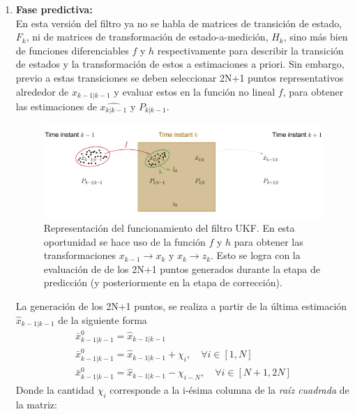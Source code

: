\begin{enumerate}
\item \textbf{Fase predictiva:}\\
En esta versi\'on del filtro \cite{ukf} ya no se habla de matrices de transici\'on de estado, $F_k$, ni de matrices de transformaci\'on de estado-a-medici\'on, $H_k$, sino m\'as bien de funciones diferenciables $f$ y $h$ respectivamente para describir la transici\'on de estados  y la transformaci\'on de estos a estimaciones a priori. Sin embargo, previo a estas transiciones se deben seleccionar 2N+1 puntos representativos alrededor de $\hat{x}_{k-1|k-1}$ y evaluar estos en la funci\'on no lineal $f$, para obtener las estimaciones de $\hat{x_{k|k-1}}$ y $P_{k|k-1}$.

\begin{figure}
\includegraphics[scale=.5]{images/ukf}
\caption{Representaci\'on del funcionamiento del filtro UKF. En esta oportunidad se hace uso de la funci\'on $f$ y $h$ para obtener las transformaciones $x_{k-1}\rightarrow x_k$ y $x_{k}\rightarrow z_k$. Esto se logra con la evaluaci\'on de de los 2N+1 puntos generados durante la etapa de predicci\'on (y posteriormente en la etapa de correcci\'on).} 
\end{figure}

La generaci\'on de los 2N+1 puntos, se realiza a partir de la \'ultima estimaci\'on $\hat{x}_{k-1|k-1}$  de la siguiente forma
\begin{equation}
\label{eq:eq18}
\begin{gathered}
\bar{x}_{k-1| k-1}^0 = \hat{x}_{k-1|k-1}\\
\bar{x}_{k-1| k-1}^0 = \hat{x}_{k-1|k-1}+ \chi_i, \quad  \forall i \in [1, N]\\
\bar{x}_{k-1| k-1}^0 = \hat{x}_{k-1|k-1}- \chi_{i-N}, \quad  \forall i \in [N+1, 2N]
\end{gathered}
\end{equation}
Donde la cantidad $\chi_i$ corresponde a la i-\'esima columna de la \textit{ra\'iz cuadrada} de la matriz:


\end{enumerate}
